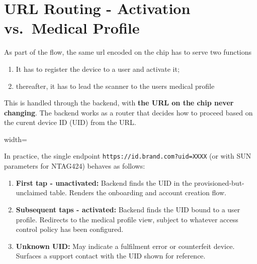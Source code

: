 \documentclass[
	a4paper, %
]{ChaosEngineReport}
\begin{document}
\newpage

\section{URL Routing - Activation vs.\ Medical Profile}
\label{sec:url-routing}

As part of the flow, the same url encoded on the chip has to serve two functions
\begin{enumerate}
\item It has to register the device to a user and activate it;
\item thereafter, it has to lead the scanner to the users medical profile
\end{enumerate}

This is handled through the backend, with \textbf{the URL on the chip never changing}. The backend works as a router that decides how to proceed based on the curent device ID (UID) from the URL.

\begin{center}
  \begin{adjustbox}{width=\linewidth} %
\end{adjustbox}
\end{center}

\vspace{4pt}
In practice, the single endpoint \texttt{https://id.brand.com?uid=XXXX} (or with SUN parameters for NTAG424) behaves as follows:

\begin{enumerate}
  \item \textbf{First tap - unactivated:} Backend finds the UID in the provisioned-but-unclaimed table. Renders the onboarding and account creation flow.
  \item \textbf{Subsequent taps - activated:} Backend finds the UID bound to a user profile. Redirects to the medical profile view, subject to whatever access control policy has been configured.
  \item \textbf{Unknown UID:} May indicate a fulfilment error or counterfeit device. Surfaces a support contact with the UID shown for reference.
\end{enumerate}
\end{document}
